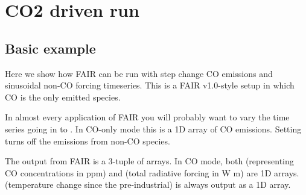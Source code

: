 \documentclass[letterpaper,10pt,english]{sphinxmanual}
\begin{document}
\section{CO2 driven run}
\label{\detokenize{examples:co2-driven-run}}

\subsection{Basic example}
\label{\detokenize{examples:basic-example}}
Here we show how FAIR can be run with step change CO
emissions and sinusoidal non-CO forcing timeseries. This is
a FAIR v1.0-style setup in which CO is the only emitted
species.

In almost every application of FAIR you will probably want to vary the
 time series going in to . In
CO-only mode this is a 1D array of CO emissions.
Setting  turns off the emissions from
non-CO species.

The output from FAIR is a 3-tuple of  arrays. In
CO mode, both  (representing CO
concentrations in ppm) and  (total radiative forcing in W
m) are 1D arrays.  (temperature change since the
pre-industrial) is always output as a 1D array.
\end{document}
